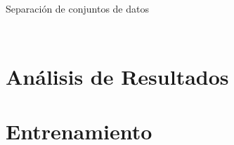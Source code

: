 \documentclass[10pt]{beamer}
\begin{document}
\begin{frame}{Separación de conjuntos de datos}
\begin{columns}
\begin{column}{0.5\textwidth}
\begin{figure}[!h]
            \end{figure}
        \end{column}
    \end{columns}
    
\end{frame}



\section{Análisis de Resultados}

\section*{Entrenamiento}
\end{document}

